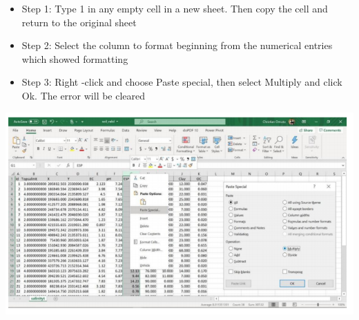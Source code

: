 \documentclass[
  10pt,
  b5paper,
]{book}
\providecommand{\tightlist}{%
  \setlength{\itemsep}{0pt}\setlength{\parskip}{0pt}}
\begin{document}
\begin{itemize}
\tightlist
\item
  Step 1: Type 1 in any empty cell in a new sheet. Then copy the cell and return to the original sheet
\item
  Step 2: Select the column to format beginning from the numerical entries which showed formatting
\item
  Step 3: Right -click and choose Paste special, then select Multiply and click Ok. The error will be cleared
\end{itemize}

\includegraphics{figures/images/FigureA5.PNG}


\end{document}
